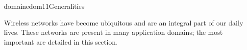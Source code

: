 \documentclass{ra2016}
\begin{document}
%
%
%
%
%




\begin{module}{domaine}{dom11}{Generalities}

Wireless networks have become ubiquitous and are an integral part of our daily lives.
These networks are present in many application domains; the most important are detailed in this section.

\end{module}
\end{document}
